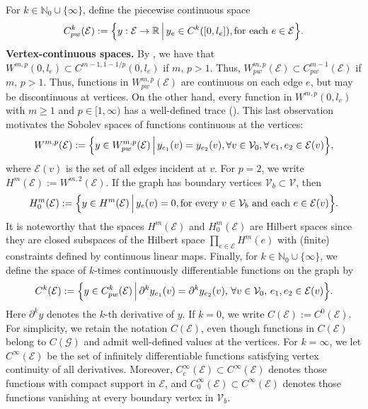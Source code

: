 \documentclass[a4paper, 10pt, english]{article}
\def\to{\rightarrow}
\begin{document}
 For $k \in \mathbb{N}_0\cup\{\infty\}$, define the piecewise continuous space
\[
C_{pw}^k(\mathcal{E})
:=
\Bigl\{
  y:\mathcal{E}\to\mathbb{R}
  \,\Big|\,
  y_e \in C^k([0,l_e]),\text{for each }e\in\mathcal{E}
\Bigr\}.
\]
\textbf{Vertex-continuous spaces.} By \cite[Chap. 5.6, Thm. 6]{evans_book}, we have that $W^{m,p}(0,l_e)\subset C^{m-1,1-1/p}(0,l_e)$ if $m,\,p>1$. Thus, $W_{pw}^{m,p}(\mathcal{E}) \subset C^{m-1}_{pw}(\mathcal{E})$ if $m,\,p>1$. Thus, functions in $W_{pw}^{m,p}(\mathcal{E})$ are continuous on each edge $e$, but may be discontinuous at vertices. On the other hand, every function in $W^{m,p}(0,l_e)$ with $m\geq1$ and $p\in[1,\infty)$ has a well-defined trace (\cite[Chapter 5.5, Theorem 1]{evans_book}). This last observation motivates the Sobolev spaces of functions continuous at the vertices:
\[
W^{m,p}(\mathcal{E})
:=
\Bigl\{
  y \in W_{pw}^{m,p}(\mathcal{E})
  \,\Big|\,
  y_{e_1}(v) = y_{e_2}(v), 
  \forall v\in\mathcal{V}_0,\forall\,e_1,e_2\in\mathcal{E}(v)
\Bigr\},
\]
where $\mathcal{E}(v)$ is the set of all edges incident at $v$. For $p=2$, we write $H^m(\mathcal{E}):=W^{m,2}(\mathcal{E})$. If the graph has boundary vertices $\mathcal{V}_b\subset\mathcal{V}$, then
\[
H_0^m(\mathcal{E})
:=
\Bigl\{
  y \in H^m(\mathcal{E})
  \,\Big|\,
  y_e(v)=0,
  \text{for every }v\in\mathcal{V}_b
  \text{ and each } e\in\mathcal{E}(v)
\Bigr\}.
\]
It is noteworthy that the spaces $H^m(\mathcal{E})$ and $H_0^m(\mathcal{E})$ are Hilbert spaces since they are closed subspaces of the Hilbert space $\prod_{e\in \mathcal{E}} H^m(e)$ with (finite) constraints defined by continuous linear maps. Finally, for $k\in \mathbb{N}_0\cup\{\infty\}$, we define the space of $k$-times continuously differentiable functions on the graph by 
\begin{align}\label{eq:continuous_functions}
C^k(\mathcal{E})
:=
\Bigl\{
   y \in C_{pw}^k(\mathcal{E})
   \,\Big|\,
   \partial^k y_{e_1}(v)
   =
   \partial^k y_{e_2}(v),\,
   \forall v\in\mathcal{V}_0,\,
   e_1,e_2 \in\mathcal{E}(v)
\Bigr\}.
\end{align}
Here $\partial^k y$ denotes the $k$-th derivative of $y$. If $k=0$, we write $C(\mathcal{E}):=C^0(\mathcal{E})$. For simplicity, we retain the notation $C(\mathcal{E})$, even though functions in $C(\mathcal{E})$ belong to $C(\mathcal{G})$ and admit well-defined values at the vertices. For $k=\infty$, we let $C^\infty(\mathcal{E})$ be the set of infinitely differentiable functions satisfying vertex continuity of all derivatives. Moreover,
$C^\infty_c(\mathcal{E})
\subset
C^\infty(\mathcal{E})$ denotes those functions with compact support in $\mathcal{E}$, and $C^\infty_0(\mathcal{E})
\subset
C^\infty(\mathcal{E})$ denotes those functions vanishing at every boundary vertex in $\mathcal{V}_b$.
\end{document}
